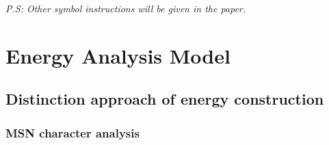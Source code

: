 \documentclass[a4paper,11pt]{article}
\begin{document}
\begin{center}
\begin{tabular}{cc}
    \bottomrule[2pt]
\end{tabular}
\end{center}



\emph{P.S: Other symbol instructions will be given in the paper.}


\section{Energy Analysis Model}


\subsection{Distinction approach of energy construction}
\subsubsection {MSN character analysis}
\end{document}
